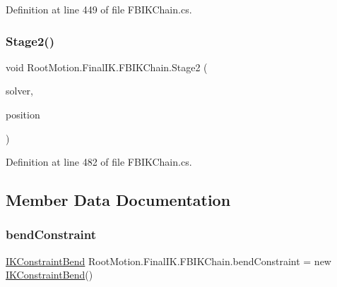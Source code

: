 Definition at line 449 of file F\+B\+I\+K\+Chain.\+cs.

\mbox{\label{class_root_motion_1_1_final_i_k_1_1_f_b_i_k_chain_a1d328994fe5179453233c2857618ee20}} 
\subsubsection{\texorpdfstring{Stage2()}{Stage2()}}
{\footnotesize\ttfamily void Root\+Motion.\+Final\+I\+K.\+F\+B\+I\+K\+Chain.\+Stage2 (\begin{DoxyParamCaption}\item[{\mbox{\hyperlink{class_root_motion_1_1_final_i_k_1_1_i_k_solver_full_body}{I\+K\+Solver\+Full\+Body}}}]{solver,  }\item[{Vector3}]{position }\end{DoxyParamCaption})}



Definition at line 482 of file F\+B\+I\+K\+Chain.\+cs.



\subsection{Member Data Documentation}
\mbox{\label{class_root_motion_1_1_final_i_k_1_1_f_b_i_k_chain_a9da22043dfd81c60bb9d3e8b7a7d6e8a}} 
\subsubsection{\texorpdfstring{bend\+Constraint}{bendConstraint}}
{\footnotesize\ttfamily \mbox{\hyperlink{class_root_motion_1_1_final_i_k_1_1_i_k_constraint_bend}{I\+K\+Constraint\+Bend}} Root\+Motion.\+Final\+I\+K.\+F\+B\+I\+K\+Chain.\+bend\+Constraint = new \mbox{\hyperlink{class_root_motion_1_1_final_i_k_1_1_i_k_constraint_bend}{I\+K\+Constraint\+Bend}}()}



